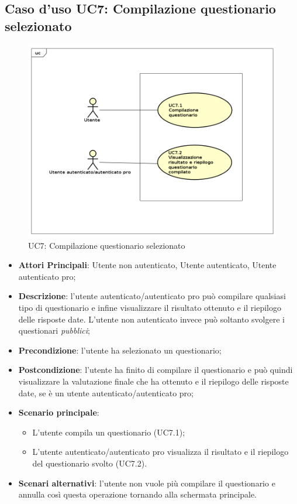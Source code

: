 \subsection{Caso d'uso UC7: Compilazione questionario selezionato}
\label{UC7}
\begin{figure}[h]
\centering
\includegraphics[scale=0.5,keepaspectratio]{UML/UC7.png}
\caption{UC7: Compilazione questionario selezionato}
\end{figure}
\FloatBarrier
\begin{itemize}
\item\textbf{Attori Principali}: Utente non autenticato, Utente autenticato, Utente autenticato pro;
\item\textbf{Descrizione}: l'utente autenticato/autenticato pro può compilare qualsiasi tipo di questionario e infine visualizzare il risultato ottenuto e il riepilogo delle risposte date. L'utente non autenticato invece può soltanto svolgere i questionari \textit{pubblici};
\item\textbf{Precondizione}: l'utente ha selezionato un questionario;
\item\textbf{Postcondizione}: l'utente ha finito di compilare il questionario e può quindi visualizzare la valutazione finale che ha ottenuto e il riepilogo delle risposte date, se è un utente autenticato/autenticato pro;
\item\textbf{Scenario principale}:
\begin{itemize}
\item L'utente compila un questionario (UC7.1);
\item L'utente autenticato/autenticato pro visualizza il risultato e il riepilogo del questionario svolto (UC7.2).
\end{itemize}
\item\textbf{Scenari alternativi}: l'utente non vuole più compilare il questionario e annulla così questa operazione tornando alla schermata principale.
\end{itemize}

